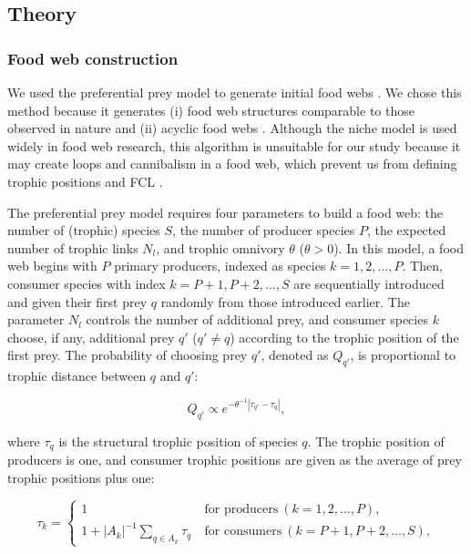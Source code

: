 \documentclass[11pt, class=article, crop=false]{standalone}
\begin{document}
\subsection{Theory}

\subsubsection{Food web construction}

We used the preferential prey model to generate initial food webs \citep{johnson_trophic_2014}.
We chose this method because it generates (i) food web structures comparable to those observed in nature and (ii) acyclic food webs \citep{shibasaki_food_2024}.
Although the niche model \citep{williams_simple_2000} is used widely in food web research, this algorithm is unsuitable for our study because it may create loops and cannibalism in a food web, which prevent us from defining trophic positions and FCL \citep{shibasaki_food_2024}.

The preferential prey model requires four parameters to build a food web: the number of (trophic) species $S$, the number of producer species $P$, the expected number of trophic links $N_l$, and trophic omnivory $\theta$ ($\theta > 0$).
In this model, a food web begins with $P$ primary producers, indexed as species $k = 1, 2, ..., P$.
Then, consumer species with index $k = P + 1, P + 2, ..., S$ are sequentially introduced and given their first prey $q$ randomly from those introduced earlier.
The parameter $N_l$ controls the number of additional prey, and consumer species $k$ choose, if any, additional prey $q'$ ($q' \ne q$) according to the trophic position of the first prey.
The probability of choosing prey $q'$, denoted as $Q_{q'}$, is proportional to trophic distance between $q$ and $q'$:

\begin{equation}
    Q_{q'} \propto e^{-\theta^{-1} |\tau_{q'} - \tau_q|},
\end{equation}

where $\tau_q$ is the structural trophic position of species $q$.
The trophic position of producers is one, and
consumer trophic positions are given as the average of prey trophic positions plus one:

\begin{equation}
    \tau_k = 
    \begin{cases}
    1 & ~\text{for producers}~ (k=1, 2, \ldots, P),\\
    1 + |A_{k}|^{-1} \sum_{q \in A_{k}} \tau_q & ~\text{for consumers}~ (k = P+1, P+2, \ldots, S),
    \end{cases}
\end{equation}
\end{document}
